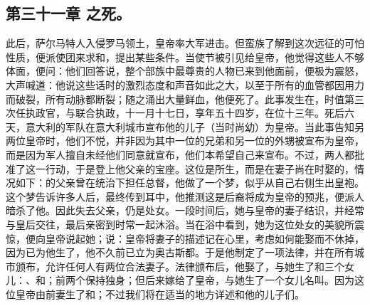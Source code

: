 
\subsection{第三十一章 之死。}

此后，萨尔马特人入侵罗马领土，皇帝率大军进击。但蛮族了解到这次远征的可怕性质，便派使团来求和，提出某些条件。当使节被引见给皇帝，他觉得这些人不够体面，便问：他们回答说，整个部族中最尊贵的人物已来到他面前，便极为震怒，大声喊道：他说这些话时的激烈态度和声音如此之大，以至于所有的血管都因用力而破裂，所有动脉都断裂；随之涌出大量鲜血，他便死了。此事发生在，时值第三次任执政官，与联合执政，十一月十七日，享年五十四岁，在位十三年。死后六天，意大利的军队在意大利城市宣布他的儿子（当时尚幼）为皇帝。当此事告知另两位皇帝时，他们不悦，并非因为其中一位的兄弟和另一位的外甥被宣布为皇帝，而是因为军人擅自未经他们同意就宣布，他们本希望自己来宣布。不过，两人都批准了这一行动，于是登上他父亲的宝座。这位是所生，而是在妻子尚在时娶的，情况如下：的父亲曾在统治下担任总督，他做了一个梦，似乎从自己右侧生出皇袍。这个梦告诉许多人后，最终传到耳中，他推测这是后裔将成为皇帝的预兆，便派人暗杀了他。因此失去父亲，仍是处女。一段时间后，她与皇帝的妻子结识，并经常与皇后交往，最后亲密到时常一起沐浴。当在浴中看到，她为这位处女的美貌所震惊，便向皇帝说起她；说：皇帝将妻子的描述记在心里，考虑如何能娶而不休掉，因为已为他生了，他不久前已立为奥古斯都。于是他制定了一项法律，并在所有城市颁布，允许任何人有两位合法妻子。法律颁布后，他娶了，与她生了和三个女儿：、和；前两个保持独身；但后来嫁给了皇帝，与她生了一个女儿名叫。因为这位皇帝由前妻生了和；不过我们将在适当的地方详述和他的儿子们。\par

